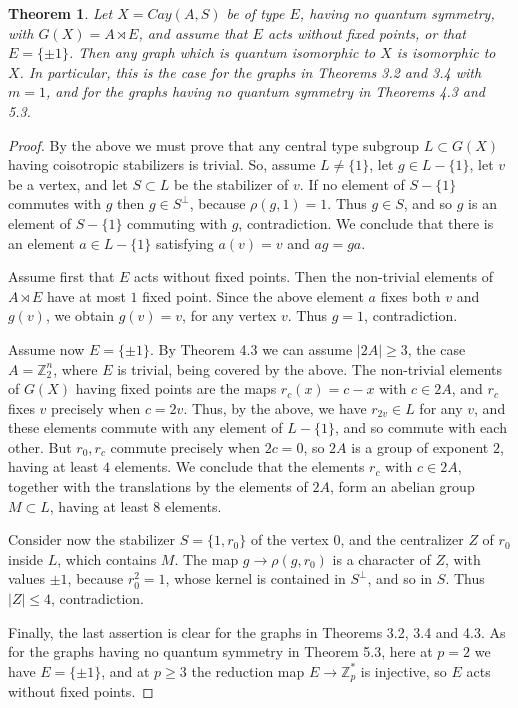 \documentclass[11pt]{amsart}
\newtheorem{theorem}{Theorem}[section]
\newcommand{\Z}{\mathbb Z}
\begin{document}
\begin{theorem}
Let $X=Cay(A,S)$ be of type $E$, having no quantum symmetry, with $G(X)=A\rtimes E$, and assume that $E$ acts without fixed points, or that $E=\{\pm1\}$. Then any graph which is quantum isomorphic to $X$ is isomorphic to $X$. In particular, this is the case for the graphs in Theorems 3.2 and 3.4 with $m=1$, and for the graphs having no quantum symmetry in Theorems 4.3 and 5.3.
\end{theorem}

\begin{proof}
By the above we must prove that any central type subgroup $L\subset G(X)$ having coisotropic stabilizers is trivial. So, assume $L\neq\{1\}$, let $g\in L-\{1\}$, let $v$ be a vertex, and let $S\subset L$ be the stabilizer of $v$. If no element of $S-\{1\}$ commutes with $g$ then $g\in S^\perp$, because $\rho(g,1)=1$. Thus $g\in S$, and so $g$ is an element of $S-\{1\}$ commuting with $g$, contradiction. We conclude that there is an element $a\in L-\{1\}$ satisfying $a(v)=v$ and $ag=ga$.

Assume first that $E$ acts without fixed points. Then the non-trivial elements of $A\rtimes E$ have at most $1$ fixed point. Since the above element $a$ fixes both $v$ and $g(v)$, we obtain $g(v)=v$, for any vertex $v$. Thus $g=1$, contradiction.

Assume now $E=\{\pm1\}$. By Theorem 4.3 we can assume $|2A|\geq3$, the case $A=\Z_2^n$, where $E$ is trivial, being covered by the above. The non-trivial elements of $G(X)$ having fixed points are the maps $r_c(x)=c-x$ with $c\in2A$, and $r_c$ fixes $v$ precisely when $c=2v$. Thus, by the above, we have $r_{2v}\in L$ for any $v$, and these elements commute with any element of $L-\{1\}$, and so commute with each other. But $r_0,r_c$ commute precisely when $2c=0$, so $2A$ is a group of exponent $2$, having at least $4$ elements. We conclude that the elements $r_c$ with $c\in2A$, together with the translations by the elements of $2A$, form an abelian group $M\subset L$, having at least $8$ elements.

Consider now the stabilizer $S=\{1,r_0\}$ of the vertex $0$, and the centralizer $Z$ of $r_0$ inside $L$, which contains $M$. The map $g\to\rho(g,r_0)$ is a character of $Z$, with values $\pm1$, because $r_0^2=1$, whose kernel is contained in $S^\perp$, and so in $S$. Thus $|Z|\leq4$, contradiction.

Finally, the last assertion is clear for the graphs in Theorems 3.2, 3.4 and 4.3. As for the graphs having no quantum symmetry in Theorem 5.3, here at $p=2$ we have $E=\{\pm1\}$, and at $p\geq3$ the reduction map $E\to\Z_p^*$ is injective, so $E$ acts without fixed points.
\end{proof}
\end{document}
